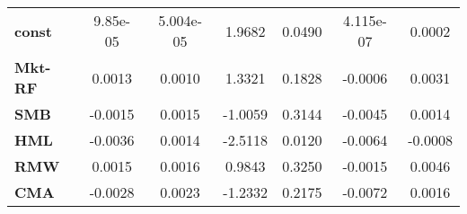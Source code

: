\begin{center}
\begin{tabular}{lcccccc}
\midrule
\textbf{const}  &      9.85e-05      &     5.004e-05      &      1.9682     &      0.0490      &     4.115e-07     &       0.0002       \\
\textbf{Mkt-RF} &       0.0013       &       0.0010       &      1.3321     &      0.1828      &      -0.0006      &       0.0031       \\
\textbf{SMB}    &      -0.0015       &       0.0015       &     -1.0059     &      0.3144      &      -0.0045      &       0.0014       \\
\textbf{HML}    &      -0.0036       &       0.0014       &     -2.5118     &      0.0120      &      -0.0064      &      -0.0008       \\
\textbf{RMW}    &       0.0015       &       0.0016       &      0.9843     &      0.3250      &      -0.0015      &       0.0046       \\
\textbf{CMA}    &      -0.0028       &       0.0023       &     -1.2332     &      0.2175      &      -0.0072      &       0.0016       \\
\bottomrule
\end{tabular}
\end{center}
